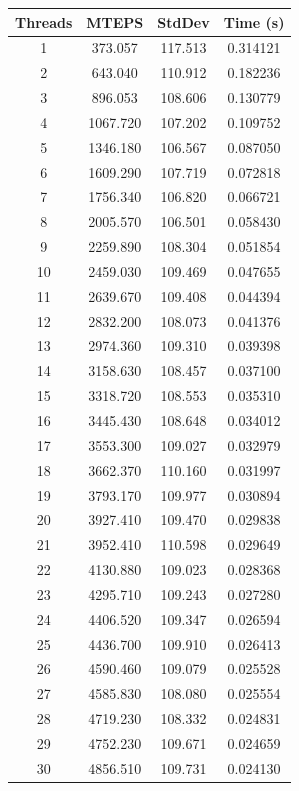 \documentclass[10pt,twocolumn,letterpaper]{article}
\begin{document}
\begin{table}[h]
\renewcommand\arraystretch{0.8}
\centering
\begin{tabular}{@{}c|ccc@{}}
\toprule
Threads          & MTEPS  & StdDev     & Time (s)      \\ \midrule
1 & 373.057 & 117.513 & 0.314121 \\
2 & 643.040 & 110.912 & 0.182236 \\
3 & 896.053 & 108.606 & 0.130779 \\
4 & 1067.720 & 107.202 & 0.109752 \\
5 & 1346.180 & 106.567 & 0.087050 \\
6 & 1609.290 & 107.719 & 0.072818 \\
7 & 1756.340 & 106.820 & 0.066721 \\
8 & 2005.570 & 106.501 & 0.058430 \\
9 & 2259.890 & 108.304 & 0.051854 \\
10 & 2459.030 & 109.469 & 0.047655 \\
11 & 2639.670 & 109.408 & 0.044394 \\
12 & 2832.200 & 108.073 & 0.041376 \\
13 & 2974.360 & 109.310 & 0.039398 \\
14 & 3158.630 & 108.457 & 0.037100 \\
15 & 3318.720 & 108.553 & 0.035310 \\
16 & 3445.430 & 108.648 & 0.034012 \\
17 & 3553.300 & 109.027 & 0.032979 \\
18 & 3662.370 & 110.160 & 0.031997 \\
19 & 3793.170 & 109.977 & 0.030894 \\
20 & 3927.410 & 109.470 & 0.029838 \\
21 & 3952.410 & 110.598 & 0.029649 \\
22 & 4130.880 & 109.023 & 0.028368 \\
23 & 4295.710 & 109.243 & 0.027280 \\
24 & 4406.520 & 109.347 & 0.026594 \\
25 & 4436.700 & 109.910 & 0.026413 \\
26 & 4590.460 & 109.079 & 0.025528 \\
27 & 4585.830 & 108.080 & 0.025554 \\
28 & 4719.230 & 108.332 & 0.024831 \\
29 & 4752.230 & 109.671 & 0.024659 \\
30 & 4856.510 & 109.731 & 0.024130 \\

\end{tabular}
\end{table}
\end{document}
